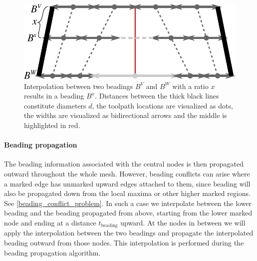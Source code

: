 \begin{figure}
\centering
\includegraphics[width=.8\columnwidth]{sources/method/beading_interpolation_v2.pdf}
\caption{
Interpolation between two beadings $B^V$ and $B^W$ with a ratio $x$ results in a beading $B^x$.
Distances between the thick black lines constitute diameters $d$,
the toolpath locations are visualized as dots,
the widths are visualized as bidirectional arrows
and the middle is highlighted in red.
}
\label{beading_interpolation}
\end{figure}


\paragraph{Beading propagation}
The beading information associated with the central nodes is then propagated outward throughout the whole mesh.
However, beading conflicts can arise where a marked edge has unmarked upward edges attached to them, since beading will also be propagated down from the local maxima or other higher marked regions.
See \cref{beading_conflict_problem}.
In such a case we interpolate between the lower beading and the beading propagated from above,
starting from the lower marked node and ending at a distance $t_\text{beading}$ upward.
At the nodes in between we will apply the interpolation between the two beadings and propagate the interpolated beading outward from those nodes.
This interpolation is performed during the beading propagation algorithm.

\fi

